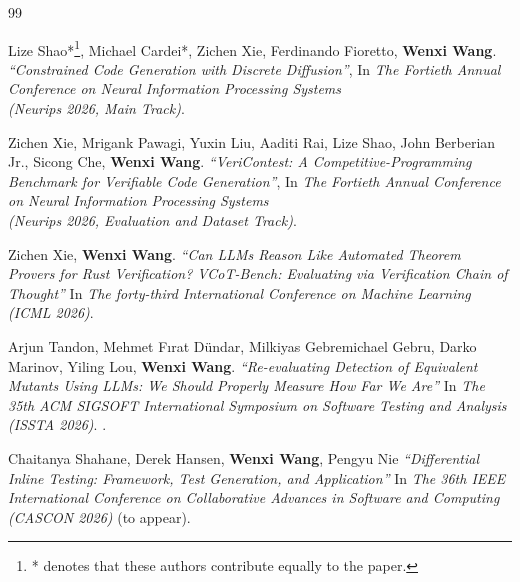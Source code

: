 \begin{thebibliography}{99} %

Lize Shao*\footnote{* denotes that these authors contribute equally to the paper.\label{note1}}, Michael Cardei*, Zichen Xie,  Ferdinando Fioretto, \textbf{Wenxi Wang}.
\emph{``Constrained Code Generation with Discrete Diffusion''}, In \textit{The Fortieth Annual Conference on Neural Information Processing Systems \\(Neurips 2026, Main Track)}. 
\href{https://arxiv.org/abs/2605.16829}{\color{color1}{\textbf{[PDF]}}}

Zichen Xie, Mrigank Pawagi, Yuxin Liu,  Aaditi Rai, 
Lize Shao, John Berberian Jr., Sicong Che, \textbf{Wenxi Wang}.
\emph{``VeriContest: A Competitive-Programming Benchmark
	for Verifiable Code Generation''}, In \textit{The Fortieth Annual Conference on Neural Information Processing Systems \\(Neurips 2026, Evaluation and Dataset Track)}.
\href{https://arxiv.org/abs/2605.08553}{\color{color1}{\textbf{[PDF]}}}


	
{{ Zichen Xie, \textbf{Wenxi Wang}.
		\emph{``Can LLMs Reason Like Automated Theorem Provers for Rust Verification? VCoT-Bench: Evaluating via Verification Chain of Thought''}
		In \textit{The forty-third International Conference on Machine Learning\\(ICML 2026)}. 
		\href{https://arxiv.org/pdf/2603.18334}{\color{color1}{\textbf{[PDF]}}}}}


{{ Arjun Tandon, Mehmet Fırat Dündar, Milkiyas Gebremichael Gebru, Darko Marinov, Yiling Lou, \textbf{Wenxi Wang}.
		\emph{``Re-evaluating Detection of Equivalent Mutants Using LLMs: We Should Properly Measure How Far We Are''}
		In \textit{The 35th ACM SIGSOFT International Symposium on Software Testing and Analysis\\(ISSTA 2026)}. 
	.
		\href{https://wenxiwang.github.io/papers/LLM4Mutant-evel.pdf}{\color{color1}{\textbf{[PDF]}}}}}


{{ Chaitanya Shahane, Derek Hansen, \textbf{Wenxi Wang}, Pengyu Nie
		\emph{``Differential Inline Testing: Framework, Test Generation, and Application''}
		In \textit{The 36th IEEE International Conference on Collaborative Advances in Software and Computing \\ (CASCON 2026)}  (to appear). }}



\end{thebibliography}
